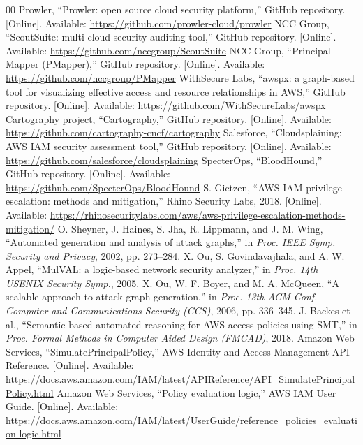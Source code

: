 \documentclass[conference]{IEEEtran}
\begin{document}
\begin{thebibliography}{00}
 Prowler, ``Prowler: open source cloud security platform,'' GitHub repository. [Online]. Available: \url{https://github.com/prowler-cloud/prowler}
 NCC Group, ``ScoutSuite: multi-cloud security auditing tool,'' GitHub repository. [Online]. Available: \url{https://github.com/nccgroup/ScoutSuite}
 NCC Group, ``Principal Mapper (PMapper),'' GitHub repository. [Online]. Available: \url{https://github.com/nccgroup/PMapper}
 WithSecure Labs, ``awspx: a graph-based tool for visualizing effective access and resource relationships in AWS,'' GitHub repository. [Online]. Available: \url{https://github.com/WithSecureLabs/awspx}
 Cartography project, ``Cartography,'' GitHub repository. [Online]. Available: \url{https://github.com/cartography-cncf/cartography}
 Salesforce, ``Cloudsplaining: AWS IAM security assessment tool,'' GitHub repository. [Online]. Available: \url{https://github.com/salesforce/cloudsplaining}
 SpecterOps, ``BloodHound,'' GitHub repository. [Online]. Available: \url{https://github.com/SpecterOps/BloodHound}
 S. Gietzen, ``AWS IAM privilege escalation: methods and mitigation,'' Rhino Security Labs, 2018. [Online]. Available: \url{https://rhinosecuritylabs.com/aws/aws-privilege-escalation-methods-mitigation/}
 O. Sheyner, J. Haines, S. Jha, R. Lippmann, and J. M. Wing, ``Automated generation and analysis of attack graphs,'' in \textit{Proc. IEEE Symp. Security and Privacy}, 2002, pp. 273--284.
 X. Ou, S. Govindavajhala, and A. W. Appel, ``MulVAL: a logic-based network security analyzer,'' in \textit{Proc. 14th USENIX Security Symp.}, 2005.
 X. Ou, W. F. Boyer, and M. A. McQueen, ``A scalable approach to attack graph generation,'' in \textit{Proc. 13th ACM Conf. Computer and Communications Security (CCS)}, 2006, pp. 336--345.
 J. Backes et al., ``Semantic-based automated reasoning for AWS access policies using SMT,'' in \textit{Proc. Formal Methods in Computer Aided Design (FMCAD)}, 2018.
 Amazon Web Services, ``SimulatePrincipalPolicy,'' AWS Identity and Access Management API Reference. [Online]. Available: \url{https://docs.aws.amazon.com/IAM/latest/APIReference/API_SimulatePrincipalPolicy.html}
 Amazon Web Services, ``Policy evaluation logic,'' AWS IAM User Guide. [Online]. Available: \url{https://docs.aws.amazon.com/IAM/latest/UserGuide/reference_policies_evaluation-logic.html}

\end{thebibliography}
\end{document}
